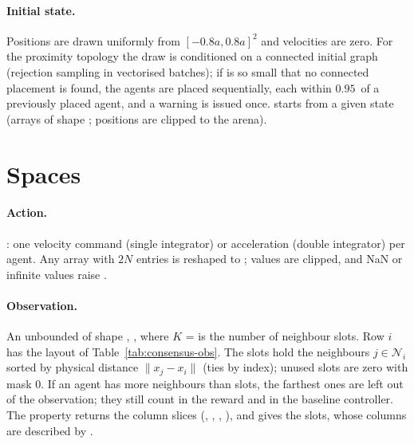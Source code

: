 \paragraph{Initial state.} Positions are drawn uniformly from
$[-0.8a, 0.8a]^2$ and velocities are zero. For the proximity topology the draw
is conditioned on a connected initial graph (rejection sampling in vectorised
batches); if  is so small that no connected placement is
found, the agents are placed sequentially, each within $0.95$\,
of a previously placed agent, and a warning is issued once.
 starts from a
given state (arrays of shape ; positions are clipped to the
arena).

\section{Spaces}\label{sec:consensus-spaces}

\paragraph{Action.} :
one velocity command (single integrator) or acceleration (double integrator) per
agent. Any array with $2N$ entries is reshaped to ; values are
clipped, and NaN or infinite values raise .

\paragraph{Observation.} An unbounded  of shape ,
, where $K$ =  is the number of neighbour
slots. Row $i$ has the layout of Table~\ref{tab:consensus-obs}. The slots hold
the neighbours $j \in \mathcal{N}_i$ sorted by physical distance
$\lVert x_j - x_i \rVert$ (ties by index); unused slots are zero with mask 0.
If an agent has more neighbours than slots, the farthest ones are left out of
the observation; they still count in the reward and in the baseline controller.
The property  returns the column slices
(, , , ), and
 gives the slots, whose
columns are described by .

